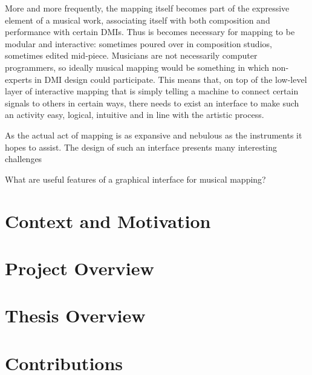 More and more frequently, the mapping itself becomes part of the expressive element of a musical work, %
associating itself with both composition and performance with certain DMIs. Thus is becomes necessary for mapping to be modular and interactive: sometimes poured over in composition studios, sometimes edited mid-piece. Musicians are not necessarily computer programmers, so ideally musical mapping would be something in which non-experts in DMI design could participate. This means that, on top of the low-level layer of interactive mapping that is simply telling a machine to connect certain signals to others in certain ways, there needs to exist an interface to make such an activity easy, logical, intuitive and in line with the artistic process.

As the actual act of mapping is as expansive and nebulous as the instruments it hopes to assist. The design of such an interface presents many interesting challenges


	What are useful features of a graphical interface for musical mapping?

\section{Context and Motivation}

\section{Project Overview}

\section{Thesis Overview}

\section{Contributions}